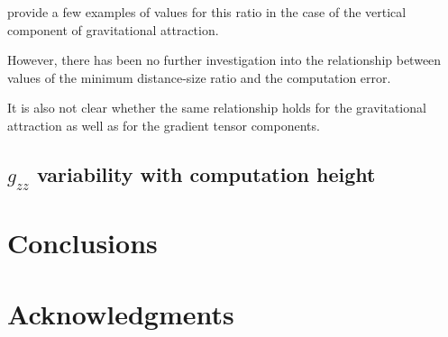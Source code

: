 \documentclass[paper,twocolumn]{geophysics}
\begin{document}
\citet{Li2011} provide a few examples of values for this ratio in the case of
the vertical component of gravitational attraction.

However, there has been no further investigation into
the relationship between values of the minimum distance-size
ratio and the computation error.

It is also not clear whether the same relationship holds for the gravitational
attraction as well as for the gradient tensor components.

\subsection{$g_{zz}$ variability with computation height}



\section{Conclusions}

\section{Acknowledgments}




\end{document}
